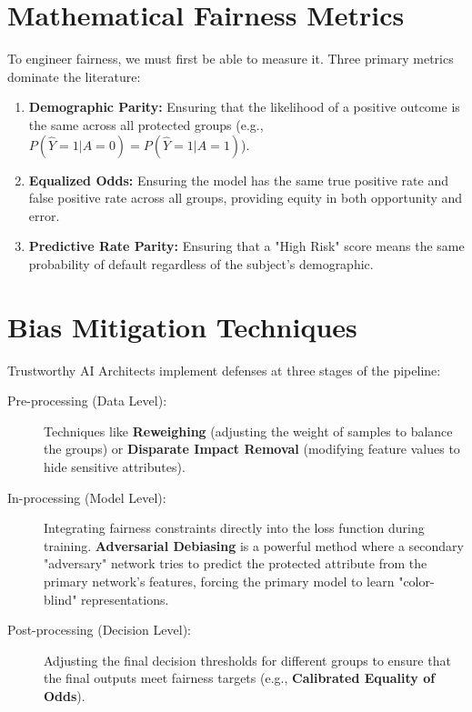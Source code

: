 \section{Mathematical Fairness Metrics}
\label{sec:fairness_metrics}

To engineer fairness, we must first be able to measure it. Three primary metrics dominate the literature:

\begin{enumerate}
    \item \textbf{Demographic Parity:} Ensuring that the likelihood of a positive outcome is the same across all protected groups (e.g., $P(\hat{Y}=1 | A=0) = P(\hat{Y}=1 | A=1)$).
    \item \textbf{Equalized Odds:} Ensuring the model has the same true positive rate and false positive rate across all groups, providing equity in both opportunity and error.
    \item \textbf{Predictive Rate Parity:} Ensuring that a "High Risk" score means the same probability of default regardless of the subject's demographic.
\end{enumerate}

\section{Bias Mitigation Techniques}
\label{sec:bias_mitigation}

Trustworthy AI Architects implement defenses at three stages of the pipeline:

\begin{description}
  \item[Pre-processing (Data Level):] 
        Techniques like \textbf{Reweighing} (adjusting the weight of samples to balance the groups) or \textbf{Disparate Impact Removal} (modifying feature values to hide sensitive attributes).
  \item[In-processing (Model Level):]
        Integrating fairness constraints directly into the loss function during training. \textbf{Adversarial Debiasing} is a powerful method where a secondary "adversary" network tries to predict the protected attribute from the primary network's features, forcing the primary model to learn "color-blind" representations.
  \item[Post-processing (Decision Level):]
        Adjusting the final decision thresholds for different groups to ensure that the final outputs meet fairness targets (e.g., \textbf{Calibrated Equality of Odds}).
\end{description}

